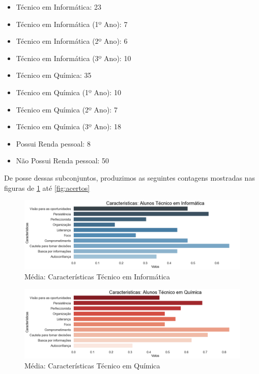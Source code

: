 \begin{itemize}[noitemsep]
    \item Técnico em Informática: 23
    \item Técnico em Informática (1º Ano): 7
    \item Técnico em Informática (2º Ano): 6
    \item Técnico em Informática (3º Ano): 10
    \item Técnico em Química: 35
    \item Técnico em Química (1º Ano): 10
    \item Técnico em Química (2º Ano): 7
    \item Técnico em Química (3º Ano): 18
    \item Possui Renda pessoal: 8
    \item Não Possui Renda pessoal: 50
\end{itemize}

De posse dessas subconjuntos, produzimos as seguintes contagens mostradas nas figuras de  \ref{fig:CaracTecI} até \ref{fig:acertos}

\begin{figure}[!h]
    \centering
    \includegraphics[width=1.0\textwidth]{img/caractTecInf.png}
    \caption{Média: Características Técnico em Informática}
    \label{fig:CaracTecI}
\end{figure}

\begin{figure}[!h]
    \centering
    \includegraphics[width=1.0\textwidth]{img/caractTecQui.png}
    \caption{Média: Características Técnico em Química}
    \label{fig:CaracTecQ}
\end{figure}

